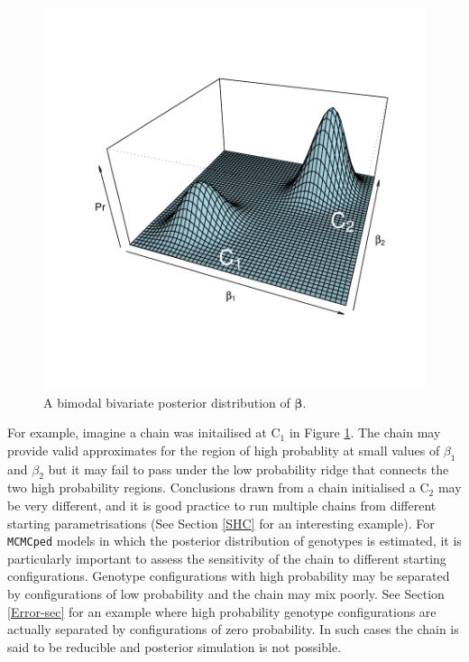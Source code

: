 \documentclass{article}
\begin{document}
\begin{figure}[!h]
\begin{center}
\includegraphics{Tutorial-008}
\end{center}
\caption{A bimodal bivariate posterior distribution of $\bm{\beta}$.}
\label{densityPMM}
\end{figure}

For example, imagine a chain was initailised at $\textrm{C}_{1}$ in Figure \ref{densityPMM}. The chain may provide valid approximates for the region of high probablity at small values of $\beta_{1}$ and $\beta_{2}$ but it may 
fail to pass under the low probability ridge that connects the two high probability regions.  Conclusions drawn from a chain initialised a $\textrm{C}_{2}$ may be very different, and it is good practice to run multiple chains from different starting parametrisations (See Section \ref{SHC} for an interesting example).  For \texttt{MCMCped} models in which the posterior distribution of genotypes is estimated, it is particularly important to assess the sensitivity of the chain to different starting configurations.  Genotype configurations with high probability may be separated by configurations of low probability and the chain may mix poorly.  See Section \ref{Error-sec} for an example where high probability genotype configurations are actually separated by configurations of zero probability.  In such cases the chain is said to be reducible and posterior simulation is not possible.
\end{document}
